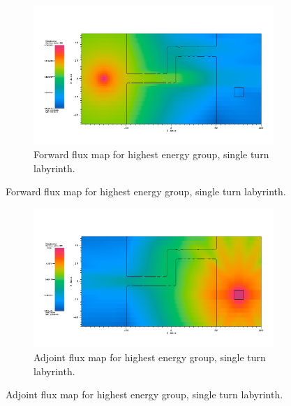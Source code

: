 \begin{figure}[htb!]
  \centering
  \begin{subfigure}[t]{\textwidth}
    \includegraphics[width=0.9\linewidth]{./chapters/characterization_probs/figures/char/maze2/maze2MfwdG00.png}
    \caption{Forward flux map for highest energy group, single turn
    labyrinth.}
    \label{fig:maze2fwd}
  \end{subfigure}
\end{figure}
\begin{figure}[htb!]\ContinuedFloat
  \centering
  \begin{subfigure}[t]{\textwidth}
    \includegraphics[width=0.9\linewidth]{./chapters/characterization_probs/figures/char/maze2/maze2MadjG00.png}
    \caption{Adjoint flux map for highest energy group, single turn
    labyrinth.}
    \label{fig:maze2adj}
  \end{subfigure}
\end{figure}
